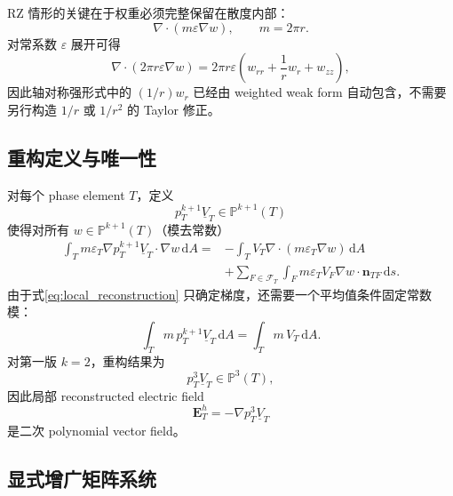 \documentclass[UTF8,a4paper,11pt]{ctexart}
\newcommand{\Pp}{\mathbb{P}}
\newcommand{\dd}{\mathrm{d}}
\newcommand{\eps}{\varepsilon}
\newcommand{\vct}[1]{\bm{#1}}
\begin{document}
RZ 情形的关键在于权重必须完整保留在散度内部：
\[
\nabla\cdot(m\eps\nabla w),\qquad m=2\pi r.
\]
对常系数 \(\eps\) 展开可得
\[
\nabla\cdot(2\pi r\eps\nabla w)
=2\pi r\eps\left(w_{rr}+\frac1r w_r+w_{zz}\right),
\]
因此轴对称强形式中的 \((1/r)w_r\) 已经由 weighted weak form 自动包含，不需要另行构造 \(1/r\) 或 \(1/r^2\) 的 Taylor 修正。

\subsection{重构定义与唯一性}

对每个 phase element \(T\)，定义
\[
p_T^{k+1}\underline V_T\in\Pp^{k+1}(T)
\]
使得对所有 \(w\in\Pp^{k+1}(T)\)（模去常数）
\begin{equation}
\boxed{
\begin{aligned}
\int_Tm\eps_T\nabla p_T^{k+1}\underline V_T\cdot\nabla w\,\dd A
=&-
\int_TV_T\nabla\cdot\left(m\eps_T\nabla w\right)\,\dd A\\
&+\sum_{F\in\mathcal F_T}
\int_Fm\eps_TV_F\nabla w\cdot\vct n_{TF}\,\dd s .
\end{aligned}
}
\label{eq:local_reconstruction}
\end{equation}
由于式\eqref{eq:local_reconstruction} 只确定梯度，还需要一个平均值条件固定常数模：
\begin{equation}
\boxed{
\int_Tm\,p_T^{k+1}\underline V_T\,\dd A
=
\int_Tm\,V_T\,\dd A.
}
\label{eq:mean_constraint}
\end{equation}
对第一版 \(k=2\)，重构结果为
\[
\boxed{p_T^3\underline V_T\in\Pp^3(T)},
\]
因此局部 reconstructed electric field
\[
\vct E_T^h=-\nabla p_T^3\underline V_T
\]
是二次 polynomial vector field。

\subsection{显式增广矩阵系统}
\end{document}
